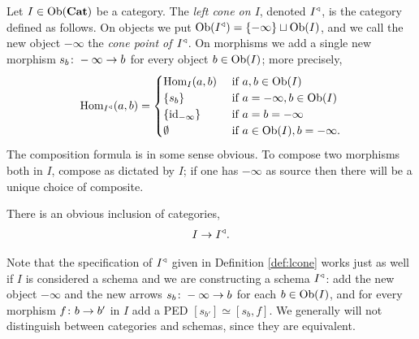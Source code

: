 \documentclass[CT4S-EN-RU]{subfiles}
\begin{document}
\begin{definitionENG}\label{def:lcone}
Let $I\in\textnormal{Ob}({\bf Cat})$ be a category. The {\em left cone on $I$}, denoted $I^\triangleleft$, is the category defined as follows. On objects we put $\textnormal{Ob}(I^\triangleleft)=\{-\infty\}\sqcup\textnormal{Ob}(I)$, and we call the new object $-\infty$ the {\em cone point of $I^\triangleleft$}. On morphisms we add a single new morphism $s_b\colon-\infty\rightarrow b$ for every object $b\in\textnormal{Ob}(I)$; more precisely,
$$\textnormal{Hom}_{I^\triangleleft}(a,b)=
\begin{cases}
\textnormal{Hom}_I(a,b)&\textnormal{ if }a,b\in\textnormal{Ob}(I)\\
\{s_b\}&\textnormal{ if }a=-\infty, b\in\textnormal{Ob}(I)\\
\{\textnormal{id}_{-\infty}\}&\textnormal{ if } a=b=-\infty\\
\emptyset&\textnormal{ if } a\in\textnormal{Ob}(I), b=-\infty.
\end{cases}$$
The composition formula is in some sense obvious. To compose two morphisms both in $I$, compose as dictated by $I$; if one has $-\infty$ as source then there will be a unique choice of composite.

There is an obvious inclusion of categories,
\begin{align}\label{dia:inclusion into cone}
I\rightarrow I^\triangleleft.
\end{align}
\end{definitionENG}

\begin{definitionRUS}\label{def:lcone}
\end{definitionRUS}

\begin{remarkENG}\label{rem:schemas are cats!}
Note that the specification of $I^\triangleleft$ given in Definition \ref{def:lcone} works just as well if $I$ is considered a schema and we are constructing a schema $I^\triangleleft$: add the new object $-\infty$ and the new arrows $s_b\colon-\infty\rightarrow b$ for each $b\in\textnormal{Ob}(I)$, and for every morphism $f\colon b\rightarrow b'$ in $I$ add a PED $[s_{b'}]\simeq[s_b,f]$. We generally will not distinguish between categories and schemas, since they are equivalent.
\end{remarkENG}

\begin{remarkRUS}\label{rem:schemas are cats!}
\end{remarkRUS}
\end{document}
